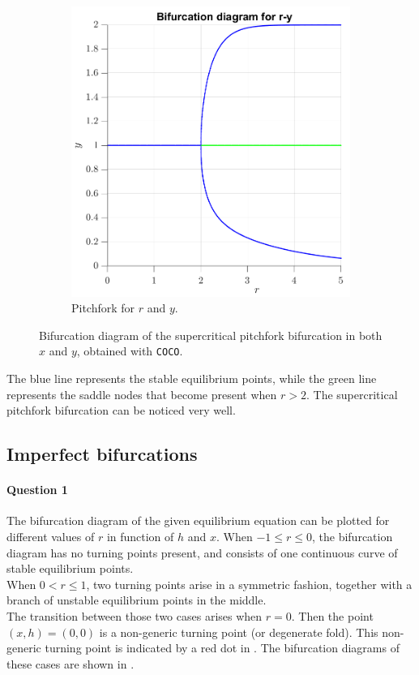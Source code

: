 \documentclass[a4paper,11pt]{article}
\begin{document}
\begin{figure}[H]
{	\begin{subfigure}[b]{0.503\textwidth}
		\includegraphics[width=\textwidth]{bif1y.png}
		\caption{Pitchfork for $r$ and $y$.}
		\label{fig:bif1y}
	\end{subfigure}
	}
	\label{fig:bif1}
	\caption{Bifurcation diagram of the supercritical pitchfork bifurcation in both $x$ and $y$, obtained with \texttt{COCO}.}
\end{figure}
The blue line represents the stable equilibrium points, while the green line represents the 
saddle nodes that become present when $r>2$. The supercritical pitchfork bifurcation can be noticed very well.

\subsection{Imperfect bifurcations}
\paragraph{Question 1}\: The bifurcation diagram of the given equilibrium equation can be plotted for different values of $r$ 
in function of $h$ and $x$. When $-1\leq r\leq0$, the bifurcation diagram has no turning points present, and consists of one 
continuous curve of stable equilibrium points.\\
When $0<r\leq1$, two turning points arise in a symmetric fashion, together with a branch of unstable equilibrium points
in the middle. \\
The transition between those two cases arises when $r=0$. Then the point $(x,h)=(0,0)$ is a non-generic turning point (or degenerate fold).
This non-generic turning point is indicated by a red dot in .
The bifurcation diagrams of these cases are shown in .
\end{document}
